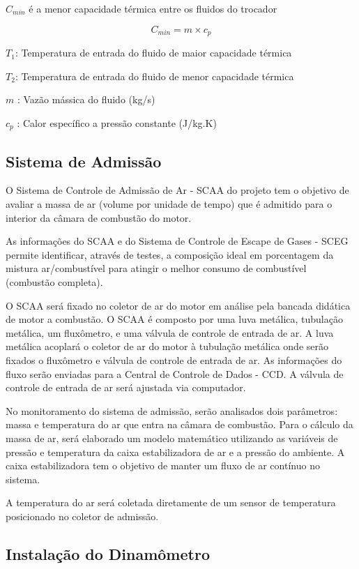 $C_{min}$ é a menor capacidade térmica entre os fluidos do trocador

\begin{equation}
	C_{min} = m \times c_{p}
\end{equation}

$T_{1}$: Temperatura de entrada do fluido de maior capacidade térmica

$T_{2}$: Temperatura de entrada do fluido de menor capacidade térmica

$m$ : Vazão mássica do fluido (kg/s)

$c_{p}$ : Calor específico a pressão constante (J/kg.K)

\subsection{Sistema de Admissão}

O Sistema de Controle de Admissão de Ar  - SCAA do projeto tem o objetivo de avaliar a massa de ar (volume por unidade de tempo) que é admitido para o interior da câmara de combustão do motor.

As informações do SCAA e do Sistema de Controle de Escape de Gases - SCEG permite identificar, através de testes, a composição ideal em porcentagem da mistura ar/combustível para atingir o melhor consumo de combustível (combustão completa). 

O SCAA será fixado no coletor de ar do motor em análise pela bancada didática de motor a combustão. O SCAA é composto por uma luva metálica, tubulação metálica, um fluxômetro, e uma válvula de controle de entrada de ar. A luva metálica acoplará o coletor de ar do motor à tubulação metálica onde serão fixados o fluxômetro e válvula de controle de entrada de ar. As informações do fluxo serão enviadas para a Central de Controle de Dados - CCD. A válvula de controle de entrada de ar será ajustada via computador.

No monitoramento do sistema de admissão, serão analisados dois parâmetros: massa e temperatura do ar que entra na câmara de combustão. Para o cálculo da massa de ar, será elaborado um modelo matemático utilizando as variáveis de pressão e temperatura da caixa estabilizadora de ar e a pressão do ambiente. A caixa estabilizadora tem o objetivo de manter um fluxo de ar contínuo no sistema.

A temperatura do ar será coletada diretamente de um sensor de temperatura posicionado no coletor de admissão.

\subsection{Instalação do Dinamômetro}

